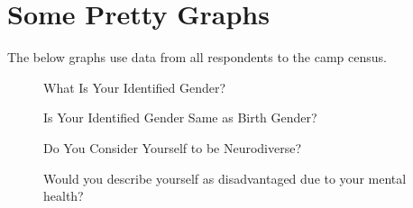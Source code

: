 \section{Some Pretty Graphs}
The below graphs use data from all respondents to the camp census.
\begin{figure}[H]
    \begin{minipage}{0.4\textwidth}
        \centering
        \caption{What Is Your Identified Gender?}
    \end{minipage}\hfill
    \begin{minipage}{0.4\textwidth}
        \centering
        \caption{Is Your Identified Gender Same as Birth Gender?}
    \end{minipage}
\end{figure}

\begin{figure}[H]
    \begin{minipage}{0.4\textwidth}
        \centering
        \caption{Do You Consider Yourself to be Neurodiverse?}
    \end{minipage}\hfill
    \begin{minipage}{0.4\textwidth}
        \centering
        \caption{Would you describe yourself as disadvantaged due to your mental health?}
    \end{minipage}
\end{figure}